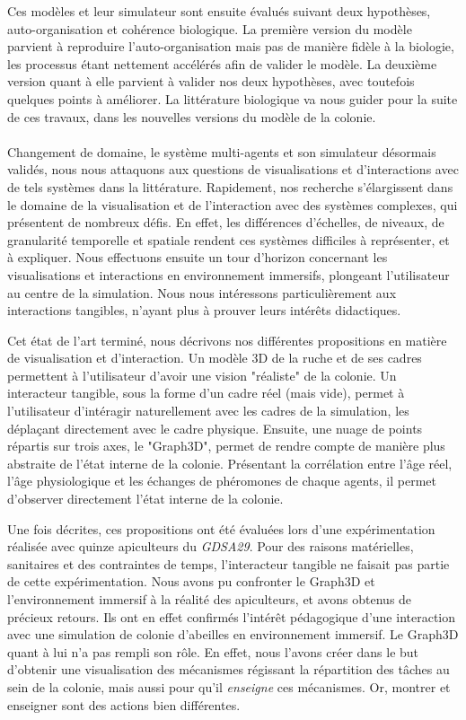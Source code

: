 Ces modèles et leur simulateur sont ensuite évalués suivant deux hypothèses, auto-organisation et cohérence biologique. La première version du modèle parvient à reproduire l'auto-organisation mais pas de manière fidèle à la biologie, les processus étant nettement accélérés afin de valider le modèle. La deuxième version quant à elle parvient à valider nos deux hypothèses, avec toutefois quelques points à améliorer. La littérature biologique va nous guider pour la suite de ces travaux, dans les nouvelles versions du modèle de la colonie.

\paragraph{}

Changement de domaine, le système multi-agents et son simulateur désormais validés, nous nous attaquons aux questions de visualisations et d'interactions avec de tels systèmes dans la littérature. Rapidement, nos recherche s'élargissent dans le domaine de la visualisation et de l'interaction avec des systèmes complexes, qui présentent de nombreux défis. En effet, les différences d'échelles, de niveaux, de granularité temporelle et spatiale rendent ces systèmes difficiles à représenter, et à expliquer. Nous effectuons ensuite un tour d'horizon concernant les visualisations et interactions en environnement immersifs, plongeant l'utilisateur au centre de la simulation. Nous nous intéressons particulièrement aux interactions tangibles, n'ayant plus à prouver leurs intérêts didactiques.

Cet état de l'art terminé, nous décrivons nos différentes propositions en matière de visualisation et d'interaction. Un modèle 3D de la ruche et de ses cadres permettent à l'utilisateur d'avoir une vision "réaliste" de la colonie. Un interacteur tangible, sous la forme d'un cadre réel (mais vide), permet à l'utilisateur d'intéragir naturellement avec les cadres de la simulation, les déplaçant directement avec le cadre physique. Ensuite, une nuage de points répartis sur trois axes, le "Graph3D", permet de rendre compte de manière plus abstraite de l'état interne de la colonie. Présentant la corrélation entre l'âge réel, l'âge physiologique et les échanges de phéromones de chaque agents, il permet d'observer directement l'état interne de la colonie.

Une fois décrites, ces propositions ont été évaluées lors d'une expérimentation réalisée avec quinze apiculteurs du \textit{GDSA29}. Pour des raisons matérielles, sanitaires et des contraintes de temps, l'interacteur tangible ne faisait pas partie de cette expérimentation. Nous avons pu confronter le Graph3D et l'environnement immersif à la réalité des apiculteurs, et avons obtenus de précieux retours. Ils ont en effet confirmés l'intérêt pédagogique d'une interaction avec une simulation de colonie d'abeilles en environnement immersif. Le Graph3D quant à lui n'a pas rempli son rôle. En effet, nous l'avons créer dans le but d'obtenir une visualisation des mécanismes régissant la répartition des tâches au sein de la colonie, mais aussi pour qu'il \textit{enseigne} ces mécanismes. Or, montrer et enseigner sont des actions bien différentes.
	
